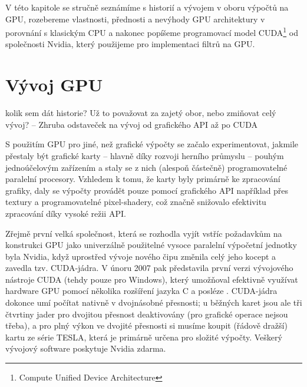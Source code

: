 






V této kapitole se stručně seznámíme s historií a vývojem v oboru výpočtů na GPU, rozebereme vlastnosti, přednosti a nevýhody GPU architektury v porovnání s klasickým CPU a nakonec popíšeme programovací model CUDA\footnote{Compute Unified Device Architecture} od společnosti Nvidia, který použijeme pro implementaci filtrů na GPU.

\section{Vývoj GPU}

    kolik sem dát historie? Už to považovat za zajetý obor, nebo zmiňovat celý vývoj? -- Zhruba odstaveček na vývoj od grafického API až po CUDA

    S použitím GPU pro jiné, než grafické výpočty se začalo experimentovat, jakmile přestaly být grafické karty -- hlavně díky rozvoji herního průmyslu -- pouhým jednoúčelovým zařízením a staly se z nich (alespoň částečně) programovatelné paralelní procesory. Vzhledem k tomu, že karty byly primárně ke zpracování grafiky, daly se výpočty provádět pouze pomocí grafického API například přes textury a programovatelné pixel-shadery, což značně snižovalo efektivitu zpracování díky vysoké režii API.

    Zřejmě první  velká společnost, která se rozhodla vyjít vstříc požadavkům na konstrukci GPU jako univerzálně použitelné vysoce paralelní výpočetní jednotky byla Nvidia, když uprostřed vývoje nového čipu změnila celý jeho kocept a zavedla tzv. CUDA-jádra. V únoru 2007 pak představila první verzi vývojového nástroje CUDA (tehdy pouze pro Windows), který umožňoval efektivně využívat hardware GPU pomocí několika rozšíření jazyka C a posléze \Cpp. CUDA-jádra dokonce umí počítat nativně v dvojnásobné přesnosti; u běžných karet jsou ale tři čtvrtiny jader pro dvojitou přesnost deaktivovány (pro grafické operace nejsou třeba), a pro plný výkon ve dvojité přesnosti si musíme koupit (řádově dražší) kartu ze série TESLA, která je primárně určena pro složité výpočty. Veškerý vývojový software poskytuje Nvidia zdarma.

